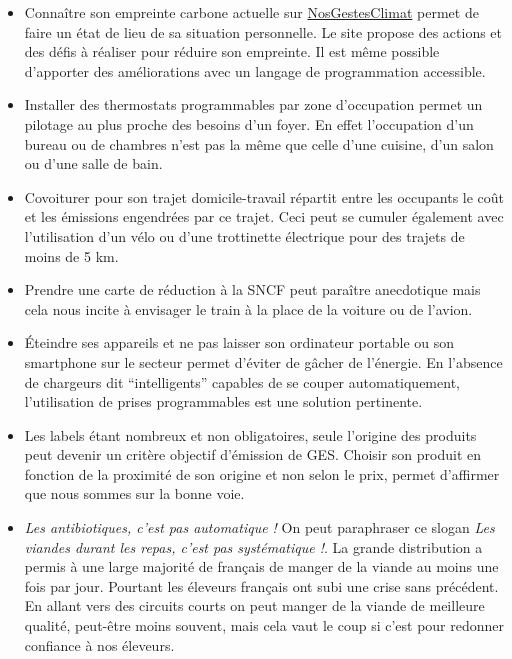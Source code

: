 \begin{itemize}
\tightlist
\item
  Connaître son empreinte carbone actuelle sur
  \href{https://nosgestesclimat.fr/}{NosGestesClimat} permet de faire un
  état de lieu de sa situation personnelle. Le site propose des actions
  et des défis à réaliser pour réduire son empreinte. Il est même
  possible d'apporter des améliorations avec un langage de programmation
  accessible.\\
\item
  Installer des thermostats programmables par zone d'occupation permet
  un pilotage au plus proche des besoins d'un foyer. En effet
  l'occupation d'un bureau ou de chambres n'est pas la même que celle
  d'une cuisine, d'un salon ou d'une salle de bain.\\
\item
  Covoiturer pour son trajet domicile-travail répartit entre les
  occupants le coût et les émissions engendrées par ce trajet. Ceci peut
  se cumuler également avec l'utilisation d'un vélo ou d'une trottinette
  électrique pour des trajets de moins de 5 km.\\
\item
  Prendre une carte de réduction à la SNCF peut paraître anecdotique
  mais cela nous incite à envisager le train à la place de la voiture ou
  de l'avion.\\
\item
  Éteindre ses appareils et ne pas laisser son ordinateur portable ou
  son smartphone sur le secteur permet d'éviter de gâcher de l'énergie.
  En l'absence de chargeurs dit ``intelligents'' capables de se couper
  automatiquement, l'utilisation de prises programmables est une
  solution pertinente.\\
\item
  Les labels étant nombreux et non obligatoires, seule l'origine des
  produits peut devenir un critère objectif d'émission de GES. Choisir
  son produit en fonction de la proximité de son origine et non selon le
  prix, permet d'affirmer que nous sommes sur la bonne voie.\\
\item
  \emph{Les antibiotiques, c'est pas automatique !} On peut paraphraser
  ce slogan \emph{Les viandes durant les repas, c'est pas systématique
  !}. La grande distribution a permis à une large majorité de français
  de manger de la viande au moins une fois par jour. Pourtant les
  éleveurs français ont subi une crise sans précédent. En allant vers
  des circuits courts on peut manger de la viande de meilleure qualité,
  peut-être moins souvent, mais cela vaut le coup si c'est pour redonner
  confiance à nos éleveurs.
\end{itemize}

